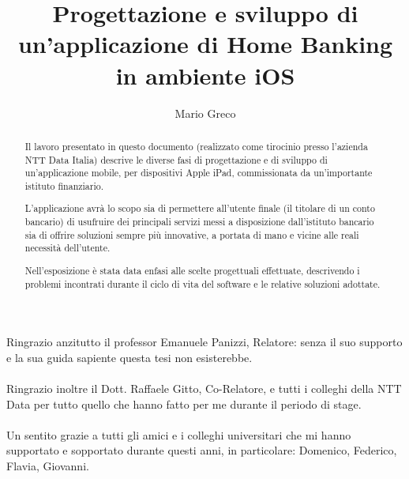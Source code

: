 \documentclass[LaM,binding=0.6cm, oneside]{sapthesis}
\title{Progettazione e sviluppo di un'applicazione di Home Banking in ambiente iOS}
\author{Mario Greco}
\begin{document}
\doublespace 
\frontmatter

\maketitle

\dedication{Dedicato a chi non ha mai mollato}

\begin{abstract}
Il lavoro presentato in questo documento (realizzato come tirocinio presso l'azienda NTT Data Italia) descrive le diverse fasi di progettazione e di sviluppo di un'applicazione mobile, per dispositivi Apple iPad,  commissionata da un'importante istituto finanziario.

L'applicazione avrà lo scopo sia di permettere all'utente finale (il titolare di un conto bancario) di usufruire dei principali servizi messi a disposizione dall'istituto bancario sia di offrire soluzioni sempre più innovative, a portata di mano e vicine alle reali necessità dell'utente.

% 

Nell'esposizione è stata data enfasi alle scelte progettuali effettuate, descrivendo i problemi incontrati durante il ciclo di vita del software e le relative soluzioni adottate.

\end{abstract}

\begin{acknowledgments}
Ringrazio anzitutto il  professor Emanuele Panizzi, Relatore: senza il suo supporto e la sua guida sapiente questa tesi non esisterebbe. 
\\\\
Ringrazio inoltre il Dott. Raffaele Gitto, Co-Relatore, e tutti i colleghi della NTT Data per tutto quello che hanno fatto per me durante il periodo di stage.
\\\\
Un sentito grazie a tutti gli amici e i colleghi universitari che mi hanno supportato e sopportato durante questi anni, in particolare: Domenico, Federico, Flavia, Giovanni. 
\end{acknowledgments}
\end{document}
